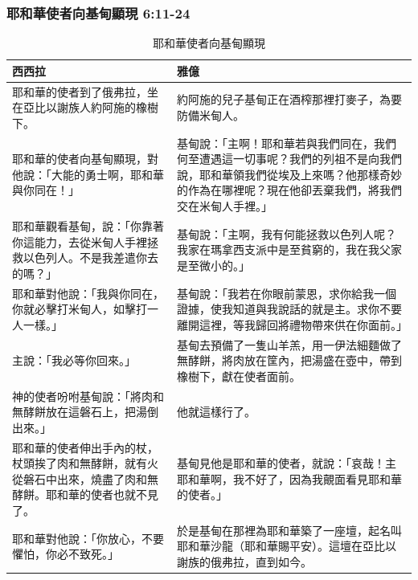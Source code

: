 \subsubsection{耶和華使者向基甸顯現 6:11-24} 
\begin{table}[H]
\centering
\begin{tabular}{p{6.5cm}|p{10.5cm}}\hline\hline
西西拉&雅億\\\hline
耶和華的使者到了俄弗拉，坐在亞比以謝族人約阿施的橡樹下。
&約阿施的兒子基甸正在酒榨那裡打麥子，為要防備米甸人。\\\hline
耶和華的使者向基甸顯現，對他說：「大能的勇士啊，耶和華與你同在！」 &基甸說：「主啊！耶和華若與我們同在，我們何至遭遇這一切事呢？我們的列祖不是向我們說，耶和華領我們從埃及上來嗎？他那樣奇妙的作為在哪裡呢？現在他卻丟棄我們，將我們交在米甸人手裡。」\\\hline
耶和華觀看基甸，說：「你靠著你這能力，去從米甸人手裡拯救以色列人。不是我差遣你去的嗎？」&基甸說：「主啊，我有何能拯救以色列人呢？我家在瑪拿西支派中是至貧窮的，我在我父家是至微小的。」\\\hline
耶和華對他說：「我與你同在，你就必擊打米甸人，如擊打一人一樣。」&基甸說：「我若在你眼前蒙恩，求你給我一個證據，使我知道與我說話的就是主。求你不要離開這裡，等我歸回將禮物帶來供在你面前。」\\\hline
主說：「我必等你回來。」&基甸去預備了一隻山羊羔，用一伊法細麵做了無酵餅，將肉放在筐內，把湯盛在壺中，帶到橡樹下，獻在使者面前。 \\\hline
神的使者吩咐基甸說：「將肉和無酵餅放在這磐石上，把湯倒出來。」&他就這樣行了。\\\hline
耶和華的使者伸出手內的杖，杖頭挨了肉和無酵餅，就有火從磐石中出來，燒盡了肉和無酵餅。耶和華的使者也就不見了。&基甸見他是耶和華的使者，就說：「哀哉！主耶和華啊，我不好了，因為我覿面看見耶和華的使者。」  \\\hline
耶和華對他說：「你放心，不要懼怕，你必不致死。」&於是基甸在那裡為耶和華築了一座壇，起名叫耶和華沙龍（耶和華賜平安）。這壇在亞比以謝族的俄弗拉，直到如今。 \\\hline
 \end{tabular}
\caption{耶和華使者向基甸顯現}
\end{table}

